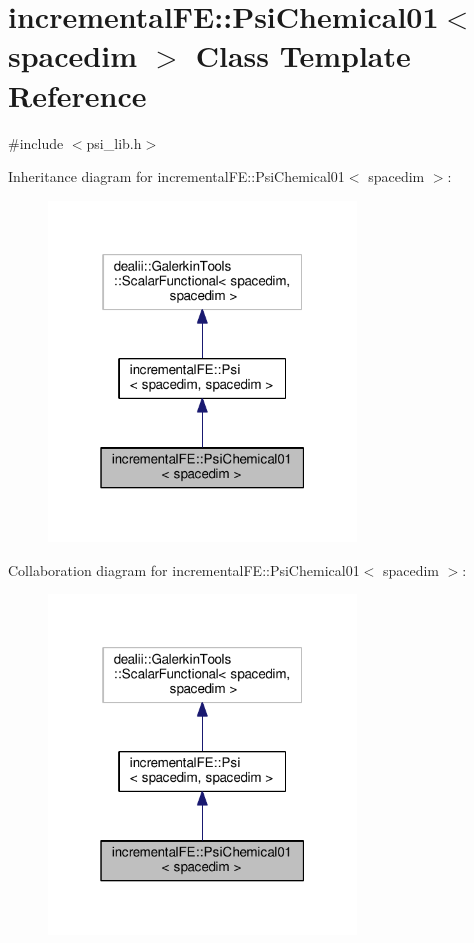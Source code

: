 \hypertarget{classincremental_f_e_1_1_psi_chemical01}{}\section{incremental\+FE\+:\+:Psi\+Chemical01$<$ spacedim $>$ Class Template Reference}
\label{classincremental_f_e_1_1_psi_chemical01}


{\ttfamily \#include $<$psi\+\_\+lib.\+h$>$}



Inheritance diagram for incremental\+FE\+:\+:Psi\+Chemical01$<$ spacedim $>$\+:\nopagebreak
\begin{figure}[H]
\begin{center}
\leavevmode
\includegraphics[width=232pt]{classincremental_f_e_1_1_psi_chemical01__inherit__graph}
\end{center}
\end{figure}


Collaboration diagram for incremental\+FE\+:\+:Psi\+Chemical01$<$ spacedim $>$\+:\nopagebreak
\begin{figure}[H]
\begin{center}
\leavevmode
\includegraphics[width=232pt]{classincremental_f_e_1_1_psi_chemical01__coll__graph}
\end{center}
\end{figure}
